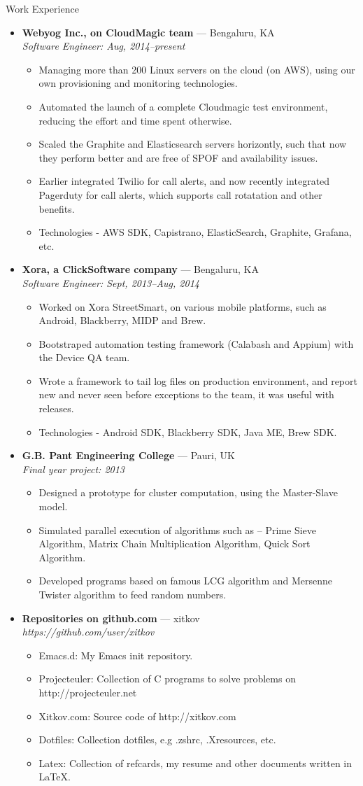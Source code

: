 \documentclass[11pt,oneside]{article}
\newenvironment{ressection}[1]{
  \vspace{4pt}
         {\fontfamily{phv}\selectfont\Large#1}
         \begin{itemize}
           \vspace{3pt}
}{
         \end{itemize}
}
\newcommand{\ressubitem}[1]{
  \vspace{-1pt}
\item \begin{flushleft} #1 \end{flushleft}
}
\newcommand{\resbigitem}[3]{
  \vspace{-5pt}
\item
  \textbf{#1} --- #2 \\
  \textit{#3}
}
\newenvironment{ressubsec}[3]{
  \resbigitem{#1}{#2}{#3}
  \vspace{-2pt}
  \begin{itemize}
}{
  \end{itemize}
}
\begin{document}
\begin{ressection}{Work Experience}
  \begin{ressubsec}{Webyog Inc., on CloudMagic team}{Bengaluru, KA}{Software Engineer: Aug, 2014--present}
    \ressubitem{Managing more than 200 Linux servers on the cloud (on AWS), using our own provisioning and monitoring technologies.}
    \ressubitem{Automated the launch of a complete Cloudmagic test environment, reducing the effort and time spent otherwise.}
    \ressubitem{Scaled the Graphite and Elasticsearch servers horizontly, such that now they perform better and are free of SPOF and availability issues.}
    \ressubitem{Earlier integrated Twilio for call alerts, and now recently integrated Pagerduty for call alerts, which supports call rotatation and other benefits.}
    \ressubitem{Technologies - AWS SDK, Capistrano, ElasticSearch, Graphite, Grafana, etc.}
  \end{ressubsec}
  \begin{ressubsec}{Xora, a ClickSoftware company}{Bengaluru, KA}{Software Engineer: Sept, 2013--Aug, 2014}
    \ressubitem{Worked on Xora StreetSmart, on various mobile platforms, such as Android, Blackberry, MIDP and Brew.}
    \ressubitem{Bootstraped automation testing framework (Calabash and Appium) with the Device QA team.}
    \ressubitem{Wrote a framework to tail log files on production environment, and report new and never seen before exceptions to the team, it was useful with releases.}
    \ressubitem{Technologies - Android SDK, Blackberry SDK, Java ME, Brew SDK.}
  \end{ressubsec}
  \begin{ressubsec}{G.B. Pant Engineering College}{Pauri, UK}{Final year project: 2013}
    \ressubitem{Designed a prototype for cluster computation, using the Master-Slave model.}
    \ressubitem{Simulated parallel execution of algorithms such as -- Prime Sieve Algorithm, Matrix Chain Multiplication Algorithm, Quick Sort Algorithm.}
    \ressubitem{Developed programs based on famous LCG algorithm and Mersenne Twister algorithm to feed random numbers.}
  \end{ressubsec}
  \begin{ressubsec}{Repositories on github.com}{xitkov}{https://github.com/user/xitkov}
    \ressubitem{Emacs.d: My Emacs init repository.}
    \ressubitem{Projecteuler: Collection of C programs to solve problems on http://projecteuler.net}
    \ressubitem{Xitkov.com: Source code of http://xitkov.com}
    \ressubitem{Dotfiles: Collection dotfiles, e.g .zshrc, .Xresources, etc.}
    \ressubitem{Latex:  Collection of refcards, my resume and other documents written in \LaTeX.}
  \end{ressubsec}
\end{ressection}
\end{document}
